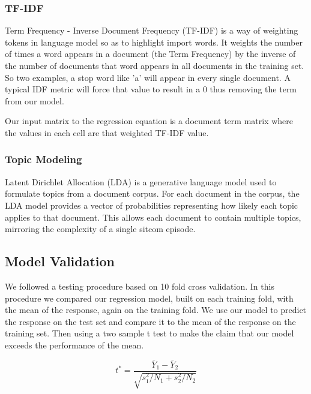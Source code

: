\documentclass{sig-alternate-05-2015}
\begin{document}
\subsubsection{TF-IDF}
Term Frequency - Inverse Document Frequency (TF-IDF) is a way of weighting tokens in language model so as to highlight import words. It weights the number of times a word appears in a document (the Term Frequency) by the inverse of the number of documents that word appears in all documents in the training set. So two examples, a stop word like 'a' will appear in every single document. A typical IDF metric will force that value to result in a 0 thus removing the term from our model. 

Our input matrix to the regression equation is a document term matrix where the values in each cell are that weighted TF-IDF value.

\subsubsection{Topic Modeling}
Latent Dirichlet Allocation (LDA) is a generative language model used to formulate topics from a document corpus. For each document in the corpus, the LDA model provides a vector of probabilities representing how likely each topic applies to that document. This allows each document to contain multiple topics, mirroring the complexity of a single sitcom episode.
\subsection{Model Validation}
We followed a testing procedure based on 10 fold cross validation. In this procedure we compared our regression model, built on each training fold, with the mean of the response, again on the training fold. We use our model to predict the response on the test set and compare it to the mean of the response on the training set. Then using a two sample t test to make the claim that our model exceeds the performance of the mean.

\begin{equation}
t^* = \frac{\bar{Y}_1 - \bar{Y}_2}{\sqrt{s_1^2/N_1 + s_2^2/N_2}}
\end{equation}
\end{document}
